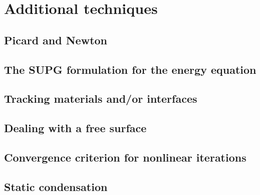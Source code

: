 \documentclass[a4paper]{article}
\begin{document}





\newpage
\section{Additional techniques} %

\subsection{Picard and Newton}

\subsection{The SUPG formulation for the energy equation}

\subsection{Tracking materials and/or interfaces}

\subsection{Dealing with a free surface}

\subsection{Convergence criterion for nonlinear iterations}

\subsection{Static condensation} 
\end{document}
